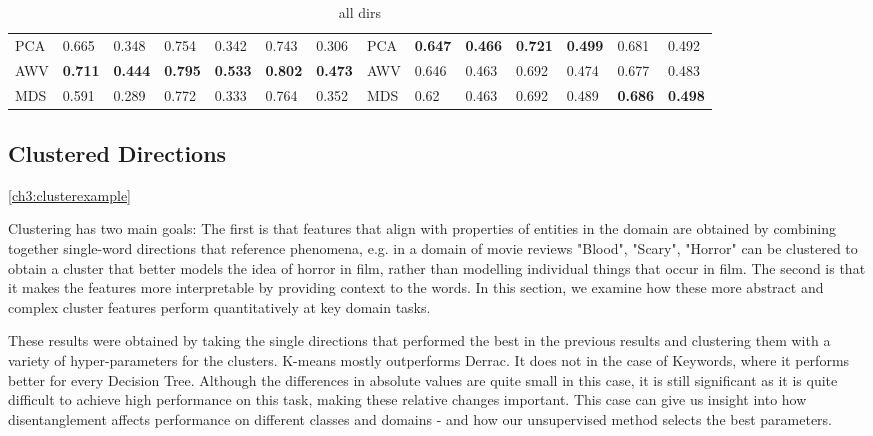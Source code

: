 \begin{landscape}
\begin{table}[]
\begin{tabular}{llllllllllllll}
PCA        & 0.665                           & 0.348                           & 0.754                           & 0.342                           & 0.743                           & 0.306                           & PCA                             & \textbf{0.647} & \textbf{0.466} & \textbf{0.721} & \textbf{0.499} & 0.681                           & 0.492                           \\
AWV        & \textbf{0.711} & \textbf{0.444} & \textbf{0.795} & \textbf{0.533} & \textbf{0.802} & \textbf{0.473} & AWV                             & 0.646                           & 0.463                           & 0.692                           & 0.474                           & 0.677                           & 0.483                           \\
MDS        & 0.591                           & 0.289                           & 0.772                           & 0.333                           & 0.764                           & 0.352                           & MDS                             & 0.62                            & 0.463                           & 0.692                           & 0.489                           & \textbf{0.686} & \textbf{0.498}
	\end{tabular}
	\caption{ all dirs}
\end{table}
\end{landscape}


\subsection{Clustered Directions}
\ref{ch3:clusterexample}

Clustering has two main goals: The first is that features that  align with properties of entities in the domain are obtained by combining together single-word directions that reference phenomena, e.g. in a domain of movie reviews "Blood", "Scary",  "Horror" can be clustered to obtain a cluster that better models the idea of horror in film, rather than modelling individual things that occur in film. The second is that it makes the features more interpretable by providing context to the words. In this section, we examine how these more abstract and complex cluster features perform quantitatively at key domain tasks.

These results were obtained by taking the single directions that performed the best in the previous results and clustering them with a variety of hyper-parameters for the clusters. K-means mostly outperforms Derrac. It does not in the case of Keywords, where it performs better for every Decision Tree. Although the differences in absolute values are quite small in this case, it is still significant as it is quite difficult to achieve high performance on this task, making these relative changes important. This case can give us insight into how disentanglement affects performance on different classes and domains - and how our unsupervised method selects the best parameters. 

